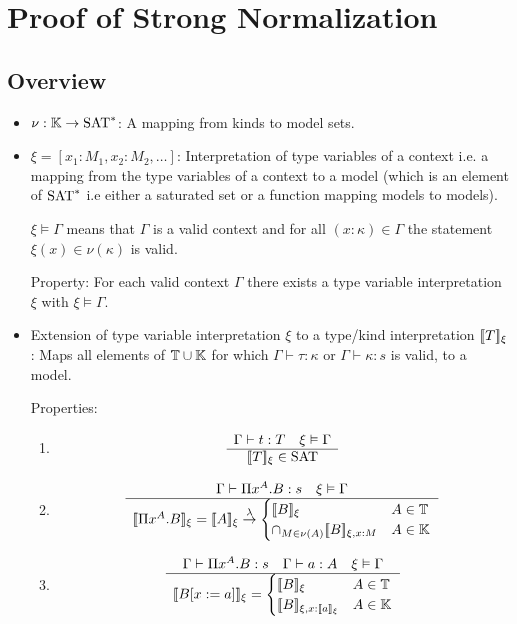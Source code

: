 \section{Proof of Strong Normalization}

\subsection{Overview}


\begin{itemize}

\item $\nu:\mathbb{K} \to \text{SAT}^*$: A mapping from kinds to model sets.

\item $\xi = [x_1:M_1, x_2:M_2, \ldots]$: Interpretation of type variables of
  a context i.e. a mapping from the type variables of a context to a model
  (which is an element of $\text{SAT}^*$ i.e either a saturated set or a function
  mapping models to models).

  $\xi \vDash \Gamma$ means that $\Gamma$ is a valid context and for all
  $(x:\kappa) \in \Gamma$ the statement $\xi(x) \in \nu(\kappa)$ is valid.

  Property: For each valid context $\Gamma$ there exists a type variable
  interpretation $\xi$ with $\xi \vDash \Gamma$.

\item Extension of type variable interpretation $\xi$ to a type/kind
  interpretation $[\![T]\!]_{\xi}$:
  Maps all elements of $\mathbb{T} \cup \mathbb{K}$
  for which $\Gamma \vdash \tau : \kappa$ or $\Gamma \vdash \kappa : s$ is
  valid, to a model.

  Properties:
  \begin{enumerate}
  \item
    $$\begin{array}{c} \Gamma\vdash t: T \quad \xi \vDash \Gamma \\ \hline [\![T]\!]_{\xi}  \in \text{SAT}\end{array}$$

  \item
    $$\ruleh
    {\Gamma\vdash \Pi x^A . B : s \quad \xi \vDash \Gamma}
    {\typint{\Pi x^A . B}{\xi}
      =
      \typint{A}{\xi} \tolam
      \begin{cases}
        \typint{B}{\xi} & A \in \Types
        \\
        \cap_{M \in \nu(A)} \typint{B}{\xi,x:M}
        & A \in \Kinds
      \end{cases}
    }$$


  \item
    $$\ruleh
    {\Gamma\vdash \Pi x^A . B : s
      \quad
      \Gamma\vdash a:A
      \quad
      \xi \vDash
      \Gamma}
    { \typint{B[x:=a]}{\xi}
      =
      \begin{cases}
        \typint{B}{\xi} & A \in \Types
        \\
        \typint{B}{\xi,x:\typint{a}{\xi}} & A \in \Kinds
      \end{cases}
    }$$
\end{enumerate}


\end{itemize}
